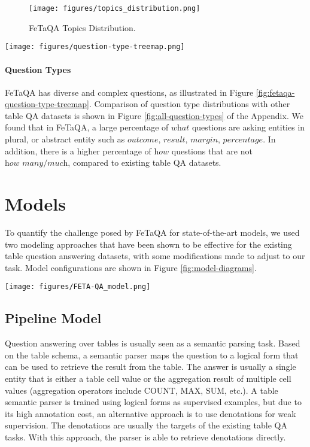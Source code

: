 \documentclass[11pt,a4paper]{article}
\newcommand{\ours}{FeTaQA\xspace}
\begin{document}
\begin{figure}[ht!]
  \centering
  \texttt{[image: figures/topics\_distribution.png]}
  \caption{\ours Topics Distribution.}
  \label{fig:topic-distribution}
\end{figure}

\begin{figure*}[ht!]
  \centering
  \texttt{[image: figures/question-type-treemap.png]}
  \caption{\ours questions by top 5 most frequent starting words, where box size represents frequency.}
  \label{fig:fetaqa-question-type-treemap}
\end{figure*}
\paragraph{Question Types}
\ours has diverse and complex questions, as illustrated in Figure \ref{fig:fetaqa-question-type-treemap}. Comparison of question type distributions with other table QA datasets is shown in Figure \ref{fig:all-question-types} of the Appendix.
We found that in \ours, a large percentage of $\textit{what}$ questions are asking entities in plural, or abstract entity such as $\textit{outcome, result, margin, percentage}$. In addition, there is a higher percentage of $\textit{how}$ questions that are not $\textit{how many/much}$, compared to existing table QA datasets.


\section{Models}
To quantify the 
challenge posed by \ours for state-of-the-art models, we used two modeling approaches that 
have been shown to be effective for the existing table question answering datasets, with some modifications made to adjust to our task. Model configurations are shown in Figure \ref{fig:model-diagrams}.

\begin{figure*}[h!]
  \centering
  \texttt{[image: figures/FETA-QA\_model.png]}
  \caption{Pipeline model and End-to-End model diagrams.}
  \label{fig:model-diagrams}
\end{figure*}

\subsection{Pipeline Model}
Question answering over tables is usually seen as a semantic parsing task. Based on the table schema, a semantic parser maps the question to a logical form that can be used to retrieve the result from the table. The answer is usually a single entity that is either a table cell value or the aggregation result of multiple cell values (aggregation operators include COUNT, MAX, SUM, etc.). A table semantic parser is trained using logical forms as supervised examples, but due to its high annotation cost, an alternative approach is to use denotations for weak supervision. The denotations are usually the targets of the existing table QA tasks. With this approach, the parser is able to retrieve denotations directly.
\end{document}
